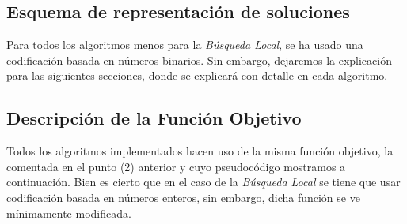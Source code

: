 \subsection{Esquema de representación de soluciones}

Para todos los algoritmos menos para la \textit{Búsqueda Local}, se ha usado una codificación basada en números binarios. Sin embargo, dejaremos la explicación para las siguientes secciones, donde se explicará con detalle en cada algoritmo.


\subsection{Descripción de la Función Objetivo}

Todos los algoritmos implementados hacen uso de la misma función objetivo, la comentada en el punto (2) anterior y cuyo pseudocódigo mostramos a continuación. Bien es cierto que en el caso de la \textit{Búsqueda Local} se tiene que usar codificación basada en números enteros, sin embargo, dicha función se ve mínimamente modificada.


\begin{figure}[H]
	\centering
	\begin{minipage}{.9\linewidth}
		
		
		
		\begin{algorithm}[H] 
			

			\SetAlgoLined
			
			
			
		\end{algorithm} 
		
	\end{minipage}
\end{figure}



